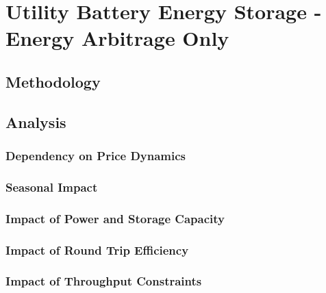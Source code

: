 \chapter{ Utility Battery Energy Storage - Energy Arbitrage Only}
\section{ Methodology }
\section{ Analysis }
\subsection{ Dependency on Price Dynamics }
\subsection{ Seasonal Impact }
\subsection{ Impact of Power and Storage Capacity }
\subsection{ Impact of Round Trip Efficiency }
\subsection{ Impact of Throughput Constraints }

